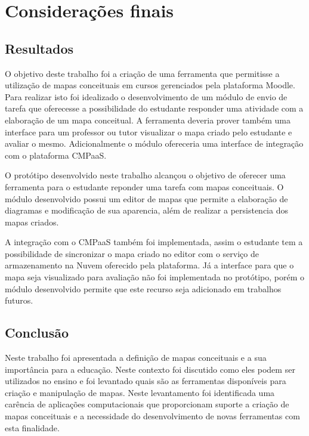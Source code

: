 \documentclass[
	12pt,				%
	openright,			%
	oneside,			%
	a4paper,			%
	english,			%
	french,				%
	spanish,			%
	brazil				%
	]{abntex2}
\begin{document}

\chapter{Considerações finais}

\section{Resultados}

O objetivo deste trabalho foi a criação de uma ferramenta que permitisse a utilização de mapas conceituais em cursos gerenciados pela plataforma Moodle. Para realizar isto foi idealizado o desenvolvimento de um módulo de envio de tarefa que oferecesse a possibilidade do estudante responder uma atividade com a elaboração de um mapa conceitual. A ferramenta deveria prover também uma interface para um professor ou tutor visualizar o mapa criado pelo estudante e avaliar o mesmo. Adicionalmente o módulo ofereceria uma interface de integração com o plataforma CMPaaS.

O protótipo desenvolvido neste trabalho alcançou o objetivo de oferecer uma ferramenta para o estudante reponder uma tarefa com mapas  conceituais. O módulo desenvolvido possui um editor de mapas que permite a elaboração de diagramas e modificação de sua aparencia, além de realizar a persistencia dos mapas criados. 

A integração com o CMPaaS também foi implementada, assim o estudante tem a possibilidade de sincronizar o mapa criado no editor com o serviço de armazenamento na Nuvem oferecido pela plataforma. Já a interface para que o mapa seja visualizado para avaliação não foi implementada no protótipo, porém o módulo desenvolvido permite que este recurso seja adicionado em trabalhos futuros.  



\section{Conclusão}

Neste trabalho foi apresentada a definição de mapas conceituais e a sua importância para a educação. Neste contexto foi discutido como eles podem ser utilizados no ensino e foi levantado quais são as ferramentas disponíveis para criação e manipulação de mapas. Neste levantamento foi identificada uma carência de aplicações computacionais que proporcionam suporte a criação de mapas conceituais e a necessidade do desenvolvimento de novas ferramentas com esta finalidade.
\end{document}
